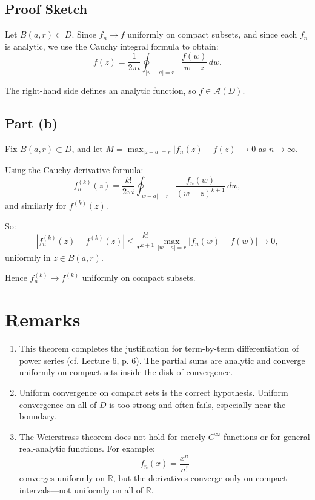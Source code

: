 \documentclass[12pt]{article}
\theoremstyle{definition} %
\theoremstyle{plain} %
\begin{document}
\subsection*{Proof Sketch}

Let $B(a, r) \subset D$. Since $f_n \to f$ uniformly on compact subsets, and since each $f_n$ is analytic, we use the Cauchy integral formula to obtain:
\[
f(z) = \frac{1}{2\pi i} \oint_{|w - a| = r} \frac{f(w)}{w - z}\,dw.
\]

The right-hand side defines an analytic function, so $f \in \mathcal{A}(D)$.

\subsection*{Part (b)}

Fix $B(a, r) \subset D$, and let $M = \max_{|z - a| = r} |f_n(z) - f(z)| \to 0$ as $n \to \infty$.

Using the Cauchy derivative formula:
\[
f_n^{(k)}(z) = \frac{k!}{2\pi i} \oint_{|w - a| = r} \frac{f_n(w)}{(w - z)^{k+1}}\,dw,
\]
and similarly for $f^{(k)}(z)$.

So:
\[
|f_n^{(k)}(z) - f^{(k)}(z)| \leq \frac{k!}{r^{k+1}} \max_{|w - a| = r} |f_n(w) - f(w)| \to 0,
\]
uniformly in $z \in B(a, r)$.

Hence $f_n^{(k)} \to f^{(k)}$ uniformly on compact subsets.

\section*{Remarks}

\begin{enumerate}
    \item This theorem completes the justification for term-by-term differentiation of power series (cf. Lecture 6, p. 6). The partial sums are analytic and converge uniformly on compact sets inside the disk of convergence.

    \item Uniform convergence on compact sets is the correct hypothesis. Uniform convergence on all of $D$ is too strong and often fails, especially near the boundary.

    \item The Weierstrass theorem does not hold for merely $C^\infty$ functions or for general real-analytic functions. For example:
    \[
    f_n(x) = \frac{x^n}{n!}
    \]
    converges uniformly on $\mathbb{R}$, but the derivatives converge only on compact intervals—not uniformly on all of $\mathbb{R}$.
\end{enumerate}
\end{document}
